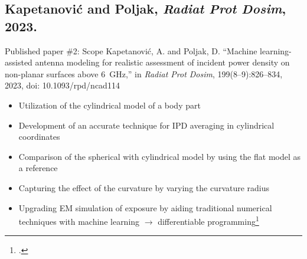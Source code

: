 \documentclass[xcolor=dvipsnames,10pt]{beamer}
\begin{document}
\subsection{Kapetanović and Poljak, \textit{Radiat Prot Dosim}, 2023.}
\begin{frame}{Published paper \#2: Scope}
    Kapetanović, A. and Poljak, D. ``Machine learning-assisted antenna modeling for realistic assessment of incident power density on non-planar surfaces above \SI{6}{\GHz},'' in \textit{Radiat Prot Dosim}, 199(8--9):826--834, 2023, doi: 10.1093/rpd/ncad114
    \begin{itemize}
        \item Utilization of the cylindrical model of a body part
        \item Development of an accurate technique for IPD averaging in cylindrical coordinates
        \item Comparison of the spherical with cylindrical model by using the flat model as a reference
        \item Capturing the effect of the curvature by varying the curvature radius
        \item Upgrading EM simulation of exposure by aiding traditional numerical techniques with machine learning $\rightarrow$ differentiable programming\footcite{Innes2019differentiable}
    \end{itemize}
\end{frame}
\end{document}
